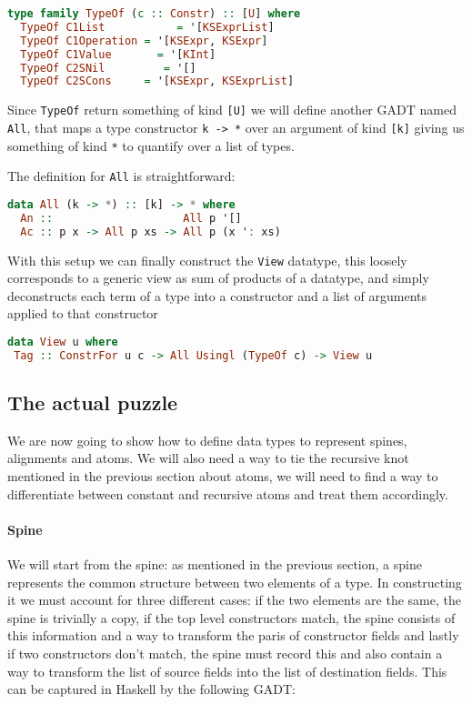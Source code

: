 \documentclass[11pt]{article}
\begin{document}
\begin{lstlisting}[language=haskell]
type family TypeOf (c :: Constr) :: [U] where
  TypeOf C1List           = '[KSExprList]
  TypeOf C1Operation = '[KSExpr, KSExpr]
  TypeOf C1Value       = '[KInt]
  TypeOf C2SNil         = '[]
  TypeOf C2SCons     = '[KSExpr, KSExprList]
\end{lstlisting}

Since \texttt{TypeOf} return something of kind \texttt{{[}U{]}} we will
define another GADT named \texttt{All}, that maps a type constructor
\texttt{k\ -\textgreater{}\ *} over an argument of kind \texttt{{[}k{]}}
giving us something of kind \texttt{*} to quantify over a list of types.

The definition for \texttt{All} is straightforward:

\begin{lstlisting}[language=haskell]
data All (k -> *) :: [k] -> * where
  An ::                    All p '[]
  Ac :: p x -> All p xs -> All p (x ': xs)
\end{lstlisting}

With this setup we can finally construct the \texttt{View} datatype,
this loosely corresponds to a generic view as sum of products of a
datatype, and simply deconstructs each term of a type into a constructor
and a list of arguments applied to that constructor

\begin{lstlisting}[language=haskell]
data View u where
 Tag :: ConstrFor u c -> All Usingl (TypeOf c) -> View u
\end{lstlisting}

\subsection{The actual puzzle}\label{the-actual-puzzle}

We are now going to show how to define data types to represent spines, 
alignments and atoms. We will also need a way to tie the recursive knot 
mentioned in the previous section about atoms, we will need to find a way to 
differentiate between constant and recursive atoms and treat them accordingly.

\paragraph{Spine}\label{spine-1}

We will start from the spine: as mentioned in the previous section, a
spine represents the common structure between two elements of a type. In
constructing it we must account for three different cases: if the two
elements are the same, the spine is trivially a copy, if the top level
constructors match, the spine consists of this information and a way to
transform the paris of constructor fields and lastly if two constructors
don't match, the spine must record this and also contain a way to
transform the list of source fields into the list of destination fields.
This can be captured in Haskell by the following GADT:
\end{document}
